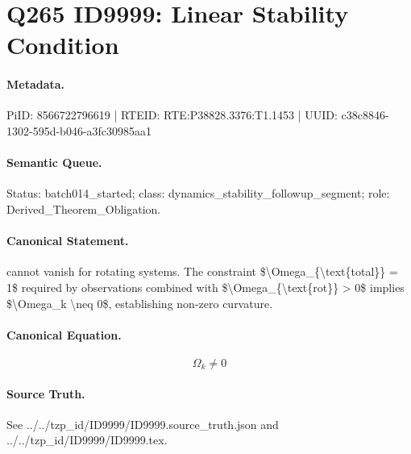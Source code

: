 \section*{Q265 ID9999: Linear Stability Condition}
\paragraph{Metadata.}
PiID: 8566722796619 | RTEID: RTE:P38828.3376:T1.1453 | UUID: c38c8846-1302-595d-b046-a3fc30985aa1

\paragraph{Semantic Queue.}
Status: batch014\_started; class: dynamics\_stability\_followup\_segment; role: Derived\_Theorem\_Obligation.

\paragraph{Canonical Statement.}
cannot vanish for rotating systems. The constraint \$\textbackslash{}Omega\_\{\textbackslash{}text\{total\}\} = 1\$ required by observations combined with \$\textbackslash{}Omega\_\{\textbackslash{}text\{rot\}\} > 0\$ implies \$\textbackslash{}Omega\_k \textbackslash{}neq 0\$, establishing non-zero curvature.

\paragraph{Canonical Equation.}
\[
\Omega_k \neq 0
\]

\paragraph{Source Truth.}
See ../../tzp\_id/ID9999/ID9999.source\_truth.json and ../../tzp\_id/ID9999/ID9999.tex.
